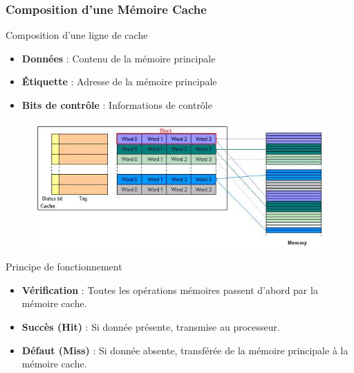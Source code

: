 \documentclass[8pt]{beamer}
\begin{document}
\begin{frame}
    \frametitle{Composition d'une Mémoire Cache}
    \begin{block}{Composition d'une ligne de cache}
        \begin{itemize}
            \item \textbf{Données} : Contenu de la mémoire principale
            \item \textbf{Étiquette} : Adresse de la mémoire principale
            \item \textbf{Bits de contrôle} : Informations de contrôle
        \end{itemize}
    \end{block}
    \begin{figure}
        \centering
        \includegraphics[width=.5\textwidth]{figures/Direct_mapped_cache.JPG}
    \end{figure}
    \vspace*{-.5cm}
    \begin{block}{Principe de fonctionnement}
        \begin{itemize}
            \item \textbf{Vérification} : Toutes les opérations mémoires
                  passent d'abord par la mémoire cache.
            \item \textbf{Succès (Hit)} : Si donnée présente, transmise
                  au processeur.
            \item \textbf{Défaut (Miss)} : Si donnée absente, transférée
                  de la mémoire principale à la mémoire cache.
        \end{itemize}
    \end{block}
\end{frame}
\end{document}

